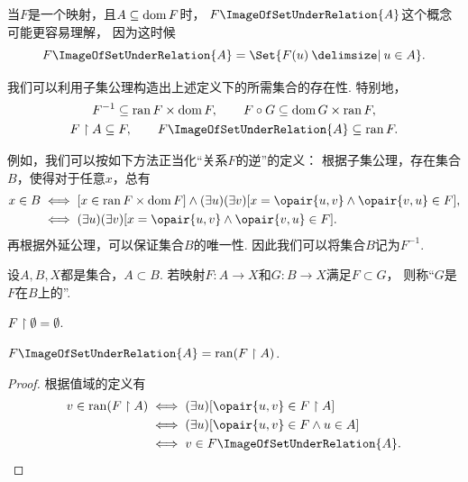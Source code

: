 当\(F\)是一个映射，且\(A \subseteq \operatorname{dom} F\)时，
\(F\ImageOfSetUnderRelation{A}\)这个概念可能更容易理解，
因为这时候\begin{equation*}
	F\ImageOfSetUnderRelation{A}
	= \Set{ F(u) \given u \in A }.
\end{equation*}

我们可以利用子集公理构造出上述定义下的所需集合的存在性.
特别地，\begin{gather*}
	F^{-1} \subseteq \ran F \times \dom F, \qquad
	F \circ G \subseteq \dom G \times \ran F, \\
	F \SetRestrict A \subseteq F, \qquad
	F\ImageOfSetUnderRelation{A} \subseteq \ran F.
\end{gather*}

例如，我们可以按如下方法正当化“关系\(F\)的逆”的定义：
根据子集公理，存在集合\(B\)，使得对于任意\(x\)，总有\begin{align*}
	x \in B
	&\iff
	[x \in \ran F \times \dom F]
	\land
	(\exists u)(\exists v)[x = \opair{u,v} \land \opair{v,u} \in F], \\
	&\iff
	(\exists u)(\exists v)[x = \opair{u,v} \land \opair{v,u} \in F].
\end{align*}
再根据外延公理，可以保证集合\(B\)的唯一性.
因此我们可以将集合\(B\)记为\(F^{-1}\).

\begin{definition}
设\(A,B,X\)都是集合，\(A \subset B\).
若映射\(F\colon A \to X\)和\(G\colon B \to X\)满足\(F \subset G\)，
则称“\(G\)是\(F\)在\(B\)上的”.
\end{definition}

\begin{theorem}
\(F \upharpoonright \emptyset = \emptyset\).
\end{theorem}

\begin{theorem}
\(F\ImageOfSetUnderRelation{A} = \ran(F \SetRestrict A)\).
\begin{proof}
根据值域的定义有\begin{align*}
	v \in \ran(F \SetRestrict A)
	&\iff
	(\exists u)[\opair{u,v} \in F \SetRestrict A] \\
	&\iff
	(\exists u)[\opair{u,v} \in F \land u \in A] \\
	&\iff
	v \in F\ImageOfSetUnderRelation{A}.
	\qedhere
\end{align*}
\end{proof}
\end{theorem}


